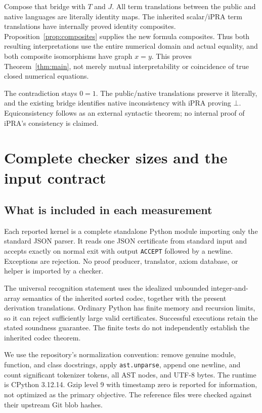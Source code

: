 \documentclass[11pt,letterpaper]{article}
\theoremstyle{definition}\newtheorem{definition}[theorem]{Definition}
\theoremstyle{remark}\newtheorem{remark}[theorem]{Remark}
\begin{document}
Compose that bridge with $T$ and $J$. All term translations between the
public and native languages are literally identity maps. The inherited
scalar/iPRA term translations have internally proved identity composites.
Proposition~\ref{prop:composites} supplies the new formula composites.
Thus both resulting interpretations use the entire numerical domain and
actual equality, and both composite isomorphisms have graph $x=y$.
This proves Theorem~\ref{thm:main}, not merely mutual interpretability or
coincidence of true closed numerical equations.

The contradiction stays $0=1$. The public/native translations preserve it
literally, and the existing bridge identifies native inconsistency with
iPRA proving $\bot$. Equiconsistency follows as an external syntactic
theorem; no internal proof of iPRA's consistency is claimed.

\section{Complete checker sizes and the input contract}

\subsection{What is included in each measurement}

Each reported kernel is a complete standalone Python module importing only
the standard JSON parser. It reads one JSON certificate from standard input
and accepts exactly on normal exit with output \texttt{ACCEPT} followed by
a newline. Exceptions are rejection. No proof producer, translator, axiom
database, or helper is imported by a checker.

The universal recognition statement uses the idealized unbounded
integer-and-array semantics of the inherited sorted codec, together with
the present derivation translations. Ordinary Python has finite memory and
recursion limits, so it can reject sufficiently large valid certificates.
Successful executions retain the stated soundness guarantee. The finite
tests do not independently establish the inherited codec theorem.

We use the repository's normalization convention: remove genuine module,
function, and class docstrings, apply \texttt{ast.unparse}, append one
newline, and count significant tokenizer tokens, all AST nodes, and UTF-8
bytes. The runtime is CPython 3.12.14. Gzip level 9 with timestamp zero is
reported for information, not optimized as the primary objective.
The reference files were checked against their upstream Git blob hashes.
\end{document}

